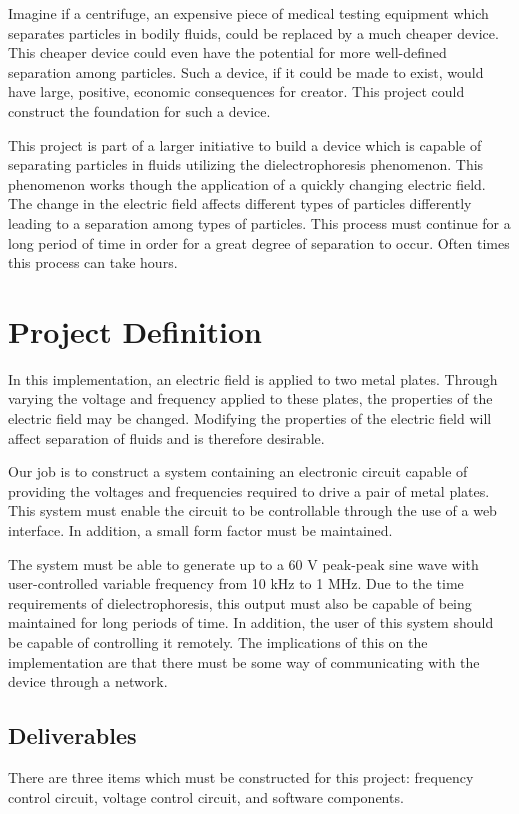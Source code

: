 \documentclass{article}	%
\begin{document}
\begin{multicols}{2}
Imagine if a centrifuge, an expensive piece of medical testing equipment which
separates particles in bodily fluids, 
could be replaced by a
much cheaper device.
This cheaper device could even have the potential for
more well-defined separation among particles.
Such a device, if it could be made to exist,
would have large, positive, economic consequences for creator.
This project could construct the foundation for
such a device.

This project is part of a larger initiative to build a device
which is capable of separating particles in fluids
utilizing the dielectrophoresis phenomenon.
This phenomenon works though the
application of a quickly changing electric field.
The change in the electric field affects
different types of particles differently leading
to a separation among types of particles.
This process must continue for a long period of time
in order for a great degree of separation to occur.
Often times this process can take hours.


\section{Project Definition}
In this implementation, an electric field is applied 
to two metal plates.
Through varying the voltage and frequency
applied to these plates, 
the properties of the electric field may be changed.
Modifying the properties of the electric field will
affect separation of fluids and
is therefore desirable.

Our job is to construct a system 
containing an electronic circuit capable of providing
the voltages and frequencies required 
to drive a pair of metal plates.
This system must enable the circuit to be controllable 
through the use of a web interface.
In addition, a small form factor must be maintained.

The system must be able to generate up to a 60 V peak-peak sine wave with
user-controlled variable frequency from 10 kHz to 1 MHz. 
Due to the time requirements of dielectrophoresis,
this output must also be capable of being maintained for long periods of time.
In addition,
the user of this system should be capable of controlling it
remotely.
The implications of this on the implementation are that
there must be some way of 
communicating with the device through a network.

\subsection{Deliverables}
There are three items which must be constructed for this project:
frequency control circuit,
voltage control circuit, and
software components.


\end{multicols}
\end{document}
